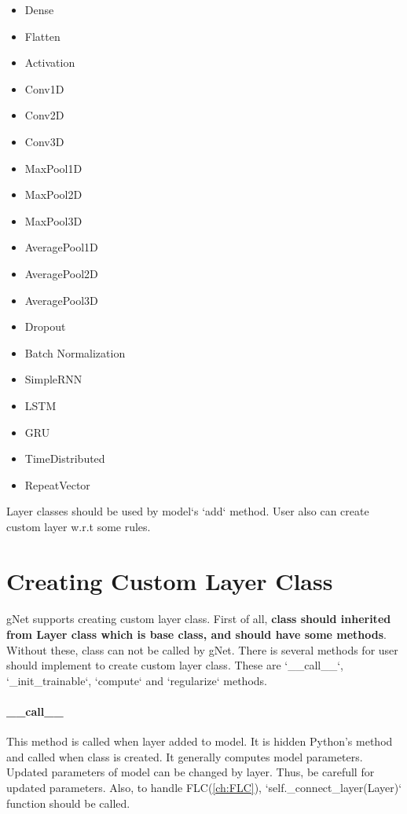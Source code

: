 \documentclass[12pt]{report}
\begin{document}
\begin{itemize}
	\item Dense
	\item Flatten
	\item Activation
	\item Conv1D
	\item Conv2D
	\item Conv3D
	\item MaxPool1D
	\item MaxPool2D
	\item MaxPool3D
	\item AveragePool1D
	\item AveragePool2D
	\item AveragePool3D
	\item Dropout
	\item Batch Normalization
	\item SimpleRNN
	\item LSTM
	\item GRU
	\item TimeDistributed
	\item RepeatVector
\end{itemize}

Layer classes should be used by model`s `add` method. User also can create custom layer w.r.t some rules. 



\section{Creating Custom Layer Class}

\paragraph{}
gNet supports creating custom layer class. First of all, \textbf{class should inherited from Layer class which is base class, and should have some methods}. Without these, class can not be called by gNet. There is several methods for user should implement to create custom layer class. These are `\_\_call\_\_`, `\_init\_trainable`, `compute` and `regularize` methods. 

\paragraph{\_\_call\_\_}
This method is called when layer added to model. It is hidden Python's method and called when class is created. It generally computes model parameters. Updated parameters of model can be changed by layer. Thus, be carefull
for updated parameters. Also, to handle FLC(\ref{ch:FLC}), `self.\_connect\_layer(Layer)` function should be called. 
\end{document}
